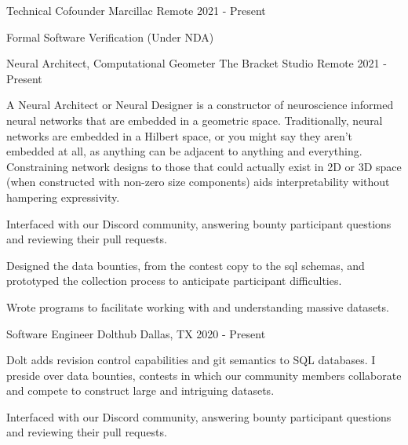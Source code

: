 \begin{cventries}
    \cventry
        {Technical Cofounder}
        {Marcillac}
        {Remote}
        {2021 - Present}
        {
            \begin{cvitems}
                \item{Formal Software Verification (Under NDA)}
            \end{cvitems}
        }
    \cventry
        {Neural Architect, Computational Geometer}
        {The Bracket Studio}
        {Remote}
        {2021 - Present}
        {
            \begin{cvparagraph}
A Neural Architect or Neural Designer is a constructor of neuroscience informed neural networks that are embedded in a geometric space. Traditionally, neural networks are embedded in a Hilbert space, or you might say they aren't embedded at all, as anything can be adjacent to anything and everything. Constraining network designs to those that could actually exist in 2D or 3D space (when constructed with non-zero size components) aids interpretability without hampering expressivity.
            \end{cvparagraph}
            \begin{cvitems}
                \item{Interfaced with our Discord community, answering bounty participant questions and reviewing their pull requests.}
                \item{Designed the data bounties, from the contest copy to the sql schemas, and prototyped the collection process to anticipate participant difficulties.}
                \item{Wrote programs to facilitate working with and understanding massive datasets.}
            \end{cvitems}
        }
    \cventry
        {Software Engineer}
        {Dolthub}
        {Dallas, TX}
        {2020 - Present}
        {
            \begin{cvparagraph}
                Dolt adds revision control capabilities and git semantics to SQL databases. I preside over data bounties, contests in which our community members collaborate and compete to construct large and intriguing datasets.
            \end{cvparagraph}
            \begin{cvitems}
                \item{Interfaced with our Discord community, answering bounty participant questions and reviewing their pull requests.}

\end{cvitems}}
\end{cventries}
